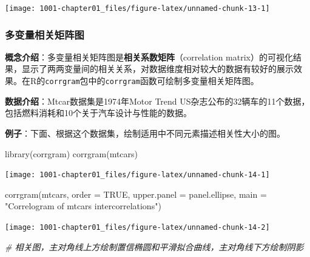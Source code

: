 \documentclass[
]{book}
\newenvironment{Shaded}{\begin{snugshade}}{\end{snugshade}}
\newcommand{\AttributeTok}[1]{\textcolor[rgb]{0.77,0.63,0.00}{#1}}
\newcommand{\CommentTok}[1]{\textcolor[rgb]{0.56,0.35,0.01}{\textit{#1}}}
\newcommand{\ConstantTok}[1]{\textcolor[rgb]{0.00,0.00,0.00}{#1}}
\newcommand{\FunctionTok}[1]{\textcolor[rgb]{0.00,0.00,0.00}{#1}}
\newcommand{\NormalTok}[1]{#1}
\newcommand{\StringTok}[1]{\textcolor[rgb]{0.31,0.60,0.02}{#1}}
\begin{document}
\begin{center}\texttt{[image: 1001-chapter01\_files/figure-latex/unnamed-chunk-13-1]} \end{center}

\hypertarget{ux591aux53d8ux91cfux76f8ux5173ux77e9ux9635ux56fe}{%
\subsubsection{多变量相关矩阵图}\label{ux591aux53d8ux91cfux76f8ux5173ux77e9ux9635ux56fe}}

\textbf{概念介绍}：多变量相关矩阵图是\textbf{相关系数矩阵}（correlation matrix）的可视化结果，显示了两两变量间的相关关系，对数据维度相对较大的数据有较好的展示效果。在R的\texttt{corrgram}包中的\texttt{corrgram}函数可绘制多变量相关矩阵图。

\textbf{数据介绍}：Mtcar数据集是1974年Motor Trend US杂志公布的32辆车的11个数据，包括燃料消耗和10个关于汽车设计与性能的数据。

\textbf{例子}：下面、根据这个数据集，绘制适用中不同元素描述相关性大小的图。

\begin{Shaded}
\begin{Highlighting}[]
\FunctionTok{library}\NormalTok{(corrgram)}
\FunctionTok{corrgram}\NormalTok{(mtcars)}
\end{Highlighting}
\end{Shaded}

\begin{center}\texttt{[image: 1001-chapter01\_files/figure-latex/unnamed-chunk-14-1]} \end{center}

\begin{Shaded}
\begin{Highlighting}[]
\FunctionTok{corrgram}\NormalTok{(mtcars, }\AttributeTok{order =} \ConstantTok{TRUE}\NormalTok{, }\AttributeTok{upper.panel =}\NormalTok{ panel.ellipse, }\AttributeTok{main =} \StringTok{"Correlogram of mtcars intercorrelations"}\NormalTok{)}
\end{Highlighting}
\end{Shaded}

\begin{center}\texttt{[image: 1001-chapter01\_files/figure-latex/unnamed-chunk-14-2]} \end{center}

\begin{Shaded}
\begin{Highlighting}[]
\CommentTok{\# 相关图，主对角线上方绘制置信椭圆和平滑拟合曲线，主对角线下方绘制阴影}
\end{Highlighting}
\end{Shaded}
\end{document}
